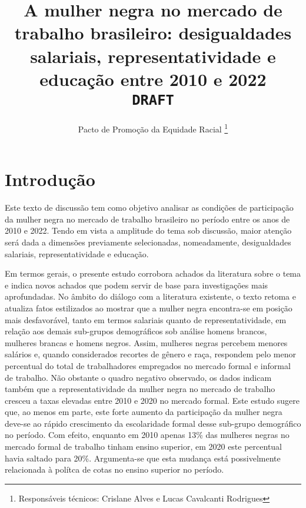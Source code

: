 \documentclass[12pt]{article}
\begin{document}
 

\linespread{1.1}

\title{%
  A mulher negra no mercado de trabalho brasileiro: desigualdades salariais, representatividade e educação entre 2010 e 2022\\
  \vspace{1cm}
  \Large \texttt{\MakeUppercase{DRAFT}}}

\author{Pacto de Promoção da Equidade Racial \thanks{Responsáveis técnicos: Crislane Alves e Lucas Cavalcanti Rodrigues}}


\maketitle

\section{Introdução}

\par Este texto de discussão tem como objetivo analisar as condições de participação da mulher negra no mercado de trabalho brasileiro no período entre os anos de 2010 e 2022. Tendo em vista a amplitude do tema sob discussão, maior atenção será dada a dimensões previamente selecionadas, nomeadamente, desigualdades salariais, representatividade e educação.

\par Em termos gerais, o presente estudo corrobora achados da literatura sobre o tema e indica novos achados que podem servir de base para investigações mais aprofundadas. No âmbito do diálogo com a literatura existente, o texto retoma e atualiza fatos estilizados ao mostrar que a mulher negra encontra-se em posição mais desfavorável, tanto em termos salariais quanto de representatividade, em relação aos demais sub-grupos demográficos sob análise \textemdash homens brancos, mulheres brancas e homens negros. Assim, mulheres negras percebem menores salários e, quando considerados recortes de gênero e raça, respondem pelo menor percentual do total de trabalhadores empregados no mercado formal e informal de trabalho. Não obstante o quadro negativo observado, os dados indicam também que a representatividade da mulher negra no mercado de trabalho cresceu a taxas elevadas entre 2010 e 2020 no mercado formal. Este estudo sugere que, ao menos em parte, este forte aumento da participação da mulher negra deve-se ao rápido crescimento da escolaridade formal desse sub-grupo demográfico no período. Com efeito, enquanto em 2010 apenas 13\% das mulheres negras no mercado formal de trabalho tinham ensino superior, em 2020 este percentual havia saltado para 20\%. Argumenta-se que esta mudança está possivelmente relacionada à polítca de cotas no ensino superior no período.
\end{document}
